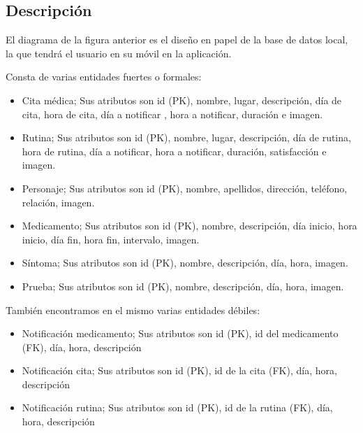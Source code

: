 \documentclass[../pfc.tex]{subfiles}
\begin{document}
		\subsection{Descripción}
		
		El diagrama de la figura anterior\cite{diagramaer} es el diseño en papel de la base de datos local, la que tendrá el usuario en su móvil en la aplicación.
		
		Consta de varias entidades fuertes o formales:
		
		\begin{itemize}
			\item Cita médica; Sus atributos son id (PK), nombre, lugar, descripción, día de cita, hora de cita, día a notificar , hora a notificar, duración e imagen.
			
			\item Rutina; Sus atributos son id (PK), nombre, lugar, descripción, día de rutina, hora de rutina, día a notificar, hora a notificar, duración, satisfacción e imagen.
			
			\item Personaje; Sus atributos son id (PK), nombre, apellidos, dirección,  teléfono, relación, imagen.
			
			\item Medicamento; Sus atributos son id (PK), nombre, descripción, día inicio, hora inicio, día fin, hora fin, intervalo, imagen.
			
			\item Síntoma; Sus atributos son id (PK), nombre, descripción, día, hora, imagen.
			
			\item Prueba; Sus atributos son id (PK), nombre, descripción, día, hora, imagen.
			
		\end{itemize}
		
		
		
		También encontramos en el mismo varias entidades débiles:
			
		\begin{itemize}
			\item Notificación medicamento; Sus atributos son id (PK), id del medicamento (FK), día, hora, descripción
			
			\item Notificación cita; Sus atributos son id (PK), id de la cita (FK), día, hora, descripción
			
			\item Notificación rutina; Sus atributos son id (PK), id de la rutina (FK), día, hora, descripción
		\end{itemize}
		
\end{document}
